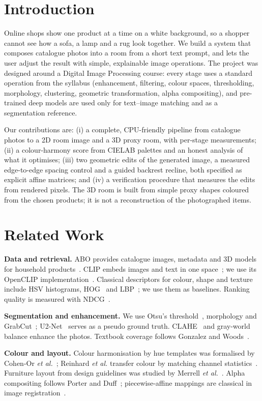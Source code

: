 \documentclass[conference]{IEEEtran}
\begin{document}
\section{Introduction}
Online shops show one product at a time on a white background, so a shopper cannot see how a sofa, a lamp and a rug look together. We build a system that composes catalogue photos into a room from a short text prompt, and lets the user adjust the result with simple, explainable image operations. The project was designed around a Digital Image Processing course: every stage uses a standard operation from the syllabus (enhancement, filtering, colour spaces, thresholding, morphology, clustering, geometric transformation, alpha compositing), and pre-trained deep models are used only for text--image matching and as a segmentation reference.

Our contributions are: (i) a complete, CPU-friendly pipeline from catalogue photos to a 2D room image and a 3D proxy room, with per-stage measurements; (ii) a colour-harmony score from CIELAB palettes and an honest analysis of what it optimises; (iii) two geometric edits of the generated image, a measured edge-to-edge spacing control and a guided backrest recline, both specified as explicit affine matrices; and (iv) a verification procedure that measures the edits from rendered pixels. The 3D room is built from simple proxy shapes coloured from the chosen products; it is not a reconstruction of the photographed items.

\section{Related Work}
\textbf{Data and retrieval.} ABO provides catalogue images, metadata and 3D models for household products~\cite{abo}. CLIP embeds images and text in one space~\cite{clip}; we use its OpenCLIP implementation~\cite{openclip}. Classical descriptors for colour, shape and texture include HSV histograms, HOG~\cite{hog} and LBP~\cite{lbp}; we use them as baselines. Ranking quality is measured with NDCG~\cite{ndcg}.

\textbf{Segmentation and enhancement.} We use Otsu's threshold~\cite{otsu}, morphology and GrabCut~\cite{grabcut}; U2-Net~\cite{u2net} serves as a pseudo ground truth. CLAHE~\cite{clahe} and gray-world balance enhance the photos. Textbook coverage follows Gonzalez and Woods~\cite{gw}.

\textbf{Colour and layout.} Colour harmonisation by hue templates was formalised by Cohen-Or \emph{et al.}~\cite{harmonization}; Reinhard \emph{et al.} transfer colour by matching channel statistics~\cite{reinhard}. Furniture layout from design guidelines was studied by Merrell \emph{et al.}~\cite{merrell}. Alpha compositing follows Porter and Duff~\cite{porterduff}; piecewise-affine mappings are classical in image registration~\cite{goshtasby}.
\end{document}
